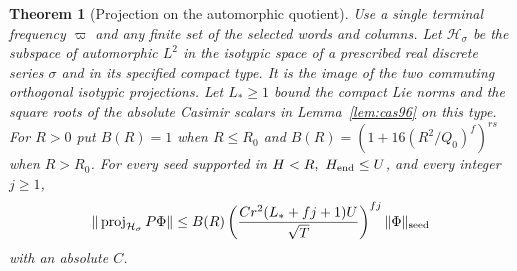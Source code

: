 \documentclass[a4paper,11pt]{article}
\newtheorem{theorem}[proposition]{Theorem}
\theoremstyle{definition}
\theoremstyle{remark}
\numberwithin{equation}{section}
\begin{document}
\begin{theorem}[Projection on the automorphic quotient]
\label{thm:project151}
Use a single terminal frequency \(\varpi\) and any finite set
of the selected words and columns. Let \(\mathcal H_\sigma\)
be the subspace of automorphic \(L^2\) in the isotypic space
of a prescribed real discrete series \(\sigma\) and in its
specified compact type. It is the image of the two commuting
orthogonal isotypic projections. Let \(L_*\ge1\) bound the
compact Lie norms and the square roots of the absolute
Casimir scalars in Lemma~\ref{lem:cas96} on this type.
For \(R>0\) put \(B(R)=1\) when \(R\le R_0\) and
\(B(R)=(1+16(R^2/Q_0)^f)^{rs}\) when \(R>R_0\).
For every seed supported in \(H<R,\ H_{\rm end}\le U\),
and every integer \(j\ge1\),
\begin{equation}
 \|\operatorname{proj}_{\mathcal H_\sigma}P\Phi\|
       \le B(R)
      \left(\frac{C r^2(L_*+fj+1)U}{\sqrt T}\right)^{fj}
                      \|\Phi\|_{\rm seed}
       \label{eq:project151}
\end{equation}
with an absolute \(C\).
\end{theorem}
\end{document}

